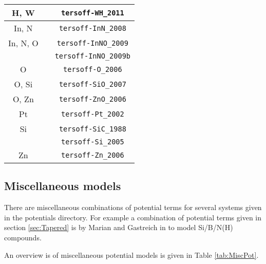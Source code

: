\begin{table}
{\begin{center}
\begin{tabular}{ccc}
      \hline
      H, W  & \cite{li2011modified} & \verb+tersoff-WH_2011+\\
      \hline
      In, N & \cite{kioseoglou2008interatomic} & \verb+tersoff-InN_2008+\\
      \hline
      In, N, O & \cite{okeke2009molecular} & \verb+tersoff-InNO_2009+\\
      & \cite{okeke2009molecular} & \verb+tersoff-InNO_2009b+\\
      \hline
      O & \cite{erhart2006analytic} & \verb+tersoff-O_2006+\\
      \hline
      O, Si & \cite{munetoh2007interatomic} & \verb+tersoff-SiO_2007+\\
      \hline
      O, Zn & \cite{erhart2006analytic} & \verb+tersoff-ZnO_2006+\\
      \hline
      Pt & \cite{albe2002modelingB}& \verb+tersoff-Pt_2002+\\
      \hline
      Si & \cite{tersoff1988new} & \verb+tersoff-SiC_1988+\\
         & \cite{erhart2005analytical} & \verb+tersoff-Si_2005+\\
         \hline
      Zn & \cite{erhart2006analytic} & \verb+tersoff-Zn_2006+\\
    \end{tabular}
  \end{center}
}
\end{table}





\subsection{Miscellaneous models}
There are miscellaneous combinations of potential terms for several
systems given in the potentials directory. For example a combination
of potential terms given in section \ref{sec:Tapered} is by Marian and
Gastreich in \cite{marian2000systematic} to model Si/B/N(H) compounds.

An overview is of miscellaneous potential models is given in Table
\ref{tab:MiscPot}.

